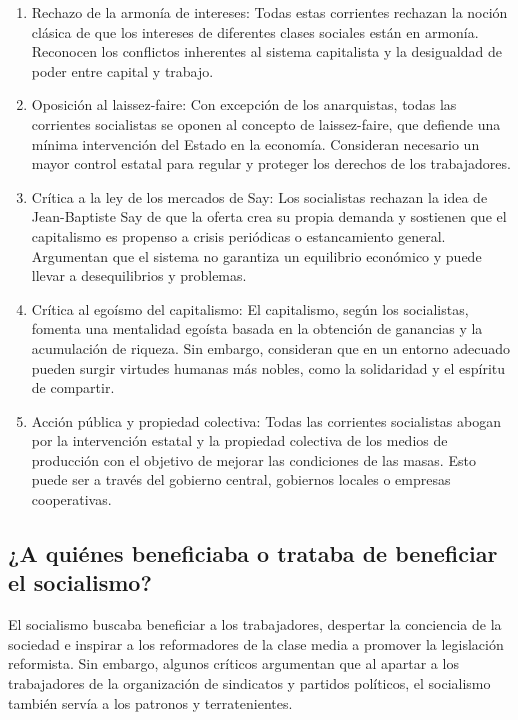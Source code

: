 \documentclass[
  jou,
  floatsintext,
  longtable,
  a4paper,
  nolmodern,
  notxfonts,
  notimes,
  12pt,
  colorlinks=true,linkcolor=blue,citecolor=blue,urlcolor=blue]{apa7}
\providecommand{\tightlist}{%
  \setlength{\itemsep}{0pt}\setlength{\parskip}{0pt}}
\begin{document}
\begin{enumerate}
\def\labelenumi{\arabic{enumi}.}
\tightlist
\item
  Rechazo de la armonía de intereses: Todas estas corrientes rechazan la
  noción clásica de que los intereses de diferentes clases sociales
  están en armonía. Reconocen los conflictos inherentes al sistema
  capitalista y la desigualdad de poder entre capital y trabajo.
\item
  Oposición al laissez-faire: Con excepción de los anarquistas, todas
  las corrientes socialistas se oponen al concepto de laissez-faire, que
  defiende una mínima intervención del Estado en la economía. Consideran
  necesario un mayor control estatal para regular y proteger los
  derechos de los trabajadores.
\item
  Crítica a la ley de los mercados de Say: Los socialistas rechazan la
  idea de Jean-Baptiste Say de que la oferta crea su propia demanda y
  sostienen que el capitalismo es propenso a crisis periódicas o
  estancamiento general. Argumentan que el sistema no garantiza un
  equilibrio económico y puede llevar a desequilibrios y problemas.
\item
  Crítica al egoísmo del capitalismo: El capitalismo, según los
  socialistas, fomenta una mentalidad egoísta basada en la obtención de
  ganancias y la acumulación de riqueza. Sin embargo, consideran que en
  un entorno adecuado pueden surgir virtudes humanas más nobles, como la
  solidaridad y el espíritu de compartir.
\item
  Acción pública y propiedad colectiva: Todas las corrientes socialistas
  abogan por la intervención estatal y la propiedad colectiva de los
  medios de producción con el objetivo de mejorar las condiciones de las
  masas. Esto puede ser a través del gobierno central, gobiernos locales
  o empresas cooperativas.
\end{enumerate}

\subsection{¿A quiénes beneficiaba o trataba de beneficiar el
socialismo?}\label{a-quiuxe9nes-beneficiaba-o-trataba-de-beneficiar-el-socialismo}

El socialismo buscaba beneficiar a los trabajadores, despertar la
conciencia de la sociedad e inspirar a los reformadores de la clase
media a promover la legislación reformista. Sin embargo, algunos
críticos argumentan que al apartar a los trabajadores de la organización
de sindicatos y partidos políticos, el socialismo también servía a los
patronos y terratenientes.
\end{document}
